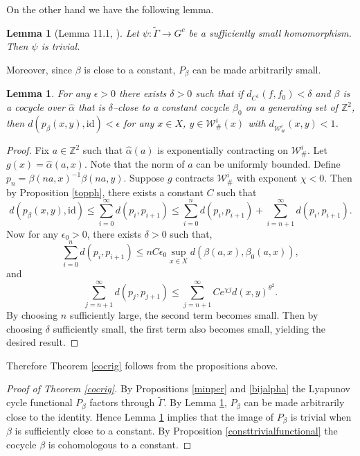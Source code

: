 \documentclass[11pt]{amsart}
\numberwithin{equation}{section}
\newcommand{\Z}{\mathbb{Z}}
\newcommand{\W}{\mathcal{W}}
\theoremstyle{plain}
\newtheorem{lem}[thm]{Lemma}
\begin{document}
On the other hand we have the following lemma.

\begin{lem}[Lemma 11.1, \cite{VinWang}]\label{latticefin}
Let $\psi:\tilde\Gamma\to G^c$ be a sufficiently small
homomorphism. Then $\psi$ is trivial.
\end{lem}

Moreover, since $\beta$ is close to a constant, $P_\beta$ can be made
arbitrarily small.

\begin{lem}\label{pbetasmall}
For any $\epsilon>0$ there exists $\delta>0$ such that if
$d_{C^1}(f,f_0)<\delta$ and $\beta$ is a cocycle over $\hat\alpha$ that
is $\delta$–close to a constant cocycle $\beta_0$ on a generating set of
$\Z^2$, then $d(p_\beta(x,y),\mathrm{id})<\epsilon$ for any
$x\in X$, $y\in\mathcal W^i_\#(x)$ with $d_{\mathcal W^i_\#}(x,y)<1$.
\end{lem}


\begin{proof}
    Fix \( a \in \mathbb{Z}^2 \) such that \( \hat{\alpha}(a) \) is exponentially contracting on \( \W^i_\# \). Let \( g(x) = \hat{\alpha}(a, x) \). Note that the norm of \( a \) can be uniformly bounded. Define \( p_n = \beta(na, x)^{-1} \beta(na, y) \). Suppose \( g \) contracts \( \W^i_\# \) with exponent \( \chi < 0 \). Then by Proposition \ref{topph}, there exists a constant \( C \) such that
    \[
    d(p_{\beta}(x,y), \mathrm{id}) \le \sum_{i=0}^{\infty} d(p_i, p_{i+1}) \le \sum_{i=0}^{n} d(p_i, p_{i+1}) + \sum_{i=n+1}^{\infty} d(p_i, p_{i+1}).
    \]
    Now for any $\epsilon_0>0$, there exists $\delta>0$ such that,
    \[
    \sum_{i=0}^{n} d(p_i, p_{i+1}) \le n C \epsilon_0 \sup_{x\in X}d(\beta(a, x), \beta_0(a, x)),
    \]
    and
    \[
    \sum_{j=n+1}^{\infty} d(p_j, p_{j+1}) \le \sum_{j=n+1}^{\infty} C e^{\chi j} d(x,y)^{\theta^2}.
    \]
    By choosing \( n \) sufficiently large, the second term becomes small. Then by choosing \( \delta \) sufficiently small, the first term also becomes small, yielding the desired result.
\end{proof}

Therefore Theorem \ref{cocrig} follows from the propositions above.

\begin{proof}[Proof of Theorem \ref{cocrig}]
By Propositions \ref{minper} and \ref{bijalpha} the Lyapunov cycle
functional $P_\beta$ factors through $\tilde\Gamma$. By Lemma
\ref{pbetasmall}, $P_\beta$ can be made arbitrarily close to the
identity. Hence Lemma \ref{latticefin} implies that the image of
$P_\beta$ is trivial when $\beta$ is sufficiently close to a constant.
By Proposition \ref{consttrivialfunctional} the cocycle $\beta$ is
cohomologous to a constant.
\end{proof}
\end{document}
